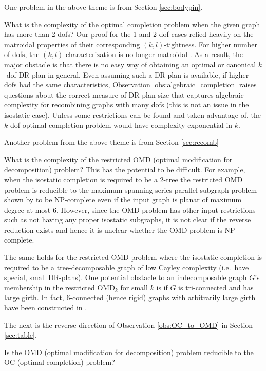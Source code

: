 One problem in the above theme is from Section \ref{sec:bodypin}.
\begin{openproblem}
    What is the complexity of the optimal completion problem when the given graph has more than 2-dofs? Our proof for the 1 and 2-dof cases relied heavily on the matroidal properties of their corresponding $(k,l)$-tightness. For higher number of dofs, the $(k,l)$ characterization is no longer matroidal \cite{Lee:2007:PGA}. As a result, the major obstacle is that there is no easy way of obtaining an optimal or canonical $k$-dof DR-plan in general. Even assuming such  a DR-plan is available, if higher dofs had the same characteristics, Observation \ref{obs:algebraic_completion} raises questions about the correct measure of DR-plan size that captures algebraic complexity for recombining graphs with many dofs (this is not an issue in the isostatic case). Unless some restrictions can be found and taken advantage of, the $k$-dof optimal completion problem would  have complexity exponential in $k$.
\end{openproblem}

Another problem from the above theme is from Section \ref{sec:recomb}
\begin{openproblem}
    What is the complexity of the restricted OMD (optimal modification for decomposition) problem? This has the potential to be difficult. For example, when the isostatic completion is required to be a 2-tree the restricted OMD problem is reducible to the maximum spanning series-parallel subgraph problem shown by \cite{cai1993spanning} to be NP-complete even if the input graph is planar of maximum degree at most 6. However, since the OMD problem has other input restrictions such as not having any proper isostatic subgraphs, it is not clear if the reverse reduction exists and hence it is unclear whether the OMD problem is NP-complete.

    The same holds for the restricted OMD problem where the isostatic completion is required to be a tree-decomposable graph of low Cayley complexity (i.e.\ have special, small DR-plans). One potential obstacle to an indecomposable graph $G$'s membership in the restricted OMD$_k$ for small $k$ is if $G$ is tri-connected and has large girth. In fact, 6-connected (hence rigid) graphs with arbitrarily large girth have been constructed in \cite{servatius2000rigidity}.
\end{openproblem}

The next is the reverse direction of Observation \ref{obs:OC_to_OMD} in Section \ref{sec:table}.
\begin{openproblem}
    Is the OMD (optimal modification for decomposition) problem reducible to the OC (optimal completion) problem?
\end{openproblem}

